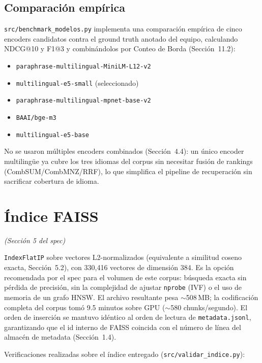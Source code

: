 \documentclass[11pt]{article}
\newcommand{\codigo}[1]{\texttt{\small #1}}
\newcommand{\seccionspec}[1]{\textit{(Sección #1 del spec)}}
\begin{document}
\subsection{Comparación empírica}

\codigo{src/benchmark\_modelos.py} implementa una comparación empírica de
cinco encoders candidatos contra el ground truth anotado del equipo,
calculando NDCG@10 y F1@3 y combinándolos por Conteo de Borda
(Sección~11.2):

\begin{itemize}[itemsep=0pt]
\small
\item \codigo{paraphrase-multilingual-MiniLM-L12-v2}
\item \codigo{multilingual-e5-small} (seleccionado)
\item \codigo{paraphrase-multilingual-mpnet-base-v2}
\item \codigo{BAAI/bge-m3}
\item \codigo{multilingual-e5-base}
\end{itemize}


No se usaron múltiples encoders combinados (Sección~4.4): un único encoder
multilingüe ya cubre los tres idiomas del corpus sin necesitar fusión de
rankings (CombSUM/CombMNZ/RRF), lo que simplifica el pipeline de recuperación
sin sacrificar cobertura de idioma.

\section{Índice FAISS}
\label{sec:faiss}
\seccionspec{5}

\codigo{IndexFlatIP} sobre vectores L2-normalizados (equivalente a similitud
coseno exacta, Sección~5.2), con 330{,}416 vectores de dimensión 384. Es la
opción recomendada por el spec para el volumen de este corpus: búsqueda
exacta sin pérdida de precisión, sin la complejidad de ajustar
\codigo{nprobe} (IVF) o el uso de memoria de un grafo HNSW. El archivo
resultante pesa $\sim$508\,MB; la codificación completa del corpus tomó
9.5 minutos sobre GPU ($\sim$580 chunks/segundo). El orden de inserción se
mantuvo idéntico al orden de lectura de \codigo{metadata.jsonl}, garantizando
que el id interno de FAISS coincida con el número de línea del almacén de
metadata (Sección~1.4).

Verificaciones realizadas sobre el índice entregado
(\codigo{src/validar\_indice.py}):
\end{document}
